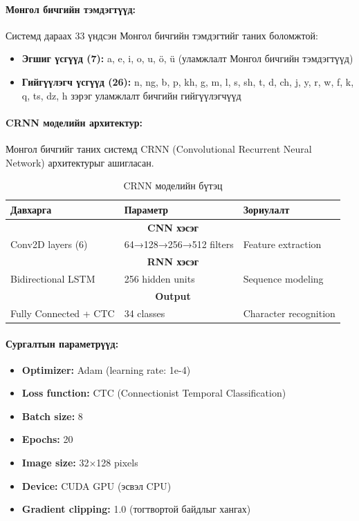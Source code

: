 \paragraph{Монгол бичгийн тэмдэгтүүд:}

Системд дараах 33 үндсэн Монгол бичгийн тэмдэгтийг таних боломжтой:

\begin{itemize}
    \item \textbf{Эгшиг үсгүүд (7):} a, e, i, o, u, ö, ü (уламжлалт Монгол бичгийн тэмдэгтүүд)
    \item \textbf{Гийгүүлэгч үсгүүд (26):} n, ng, b, p, kh, g, m, l, s, sh, t, d, ch, j, y, r, w, f, k, q, ts, dz, h зэрэг уламжлалт бичгийн гийгүүлэгчүүд
\end{itemize}

\paragraph{CRNN моделийн архитектур:}

Монгол бичгийг таних системд CRNN (Convolutional Recurrent Neural Network) архитектурыг ашигласан.

\begin{table}[H]
\centering
\caption{CRNN моделийн бүтэц}
\label{tab:crnn-architecture}
\begin{tabular}{|l|l|l|}
\hline
\textbf{Давхарга} & \textbf{Параметр} & \textbf{Зориулалт} \\
\hline
\multicolumn{3}{|c|}{\textbf{CNN хэсэг}} \\
\hline
Conv2D layers (6) & 64→128→256→512 filters & Feature extraction \\
\hline
\multicolumn{3}{|c|}{\textbf{RNN хэсэг}} \\
\hline
Bidirectional LSTM & 256 hidden units & Sequence modeling \\
\hline
\multicolumn{3}{|c|}{\textbf{Output}} \\
\hline
Fully Connected + CTC & 34 classes & Character recognition \\
\hline
\end{tabular}
\end{table}

\paragraph{Сургалтын параметрүүд:}

\begin{itemize}
    \item \textbf{Optimizer:} Adam (learning rate: 1e-4)
    \item \textbf{Loss function:} CTC (Connectionist Temporal Classification)
    \item \textbf{Batch size:} 8
    \item \textbf{Epochs:} 20
    \item \textbf{Image size:} 32×128 pixels
    \item \textbf{Device:} CUDA GPU (эсвэл CPU)
    \item \textbf{Gradient clipping:} 1.0 (тогтвортой байдлыг хангах)
\end{itemize}


